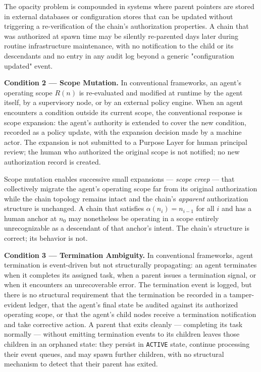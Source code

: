 The opacity problem is compounded in systems where parent pointers are stored in external databases or configuration stores that can be updated without triggering a re-verification of the chain's authorization properties. A chain that was authorized at spawn time may be silently re-parented days later during routine infrastructure maintenance, with no notification to the child or its descendants and no entry in any audit log beyond a generic "configuration updated" event.

\medskip
\noindent\textbf{Condition 2 — Scope Mutation.}
In conventional frameworks, an agent's operating scope $R(n)$ is re-evaluated and modified at runtime by the agent itself, by a supervisory node, or by an external policy engine. When an agent encounters a condition outside its current scope, the conventional response is scope expansion: the agent's authority is extended to cover the new condition, recorded as a policy update, with the expansion decision made by a machine actor. The expansion is not submitted to a Purpose Layer for human principal review; the human who authorized the original scope is not notified; no new authorization record is created.

Scope mutation enables successive small expansions — \emph{scope creep} — that collectively migrate the agent's operating scope far from its original authorization while the chain topology remains intact and the chain's \emph{apparent} authorization structure is unchanged. A chain that satisfies $\alpha(n_i) = n_{i-1}$ for all $i$ and has a human anchor at $n_0$ may nonetheless be operating in a scope entirely unrecognizable as a descendant of that anchor's intent. The chain's structure is correct; its behavior is not.

\medskip
\noindent\textbf{Condition 3 — Termination Ambiguity.}
In conventional frameworks, agent termination is event-driven but not structurally propagating: an agent terminates when it completes its assigned task, when a parent issues a termination signal, or when it encounters an unrecoverable error. The termination event is logged, but there is no structural requirement that the termination be recorded in a tamper-evident ledger, that the agent's final state be audited against its authorized operating scope, or that the agent's child nodes receive a termination notification and take corrective action. A parent that exits cleanly — completing its task normally — without emitting termination events to its children leaves those children in an orphaned state: they persist in \texttt{ACTIVE} state, continue processing their event queues, and may spawn further children, with no structural mechanism to detect that their parent has exited.

